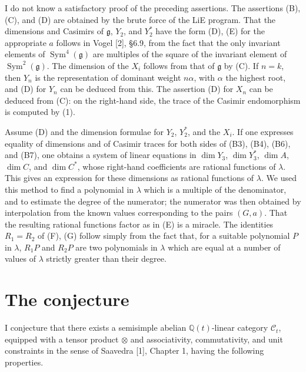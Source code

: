 \documentclass[11pt,a4paper]{article}
\DeclareMathOperator{\Sym}{Sym}
\newcommand{\frg}{\mathfrak{g}}
\newcommand{\Q}{\mathbb{Q}}
\begin{document}
I do not know a satisfactory proof of the preceding assertions. The assertions (B), (C), and (D) are obtained by the brute force of the LiE program. That the dimensions and Casimirs of $\frg$, $Y_2$, and $Y_2^*$ have the form (D), (E) for the appropriate $a$ follows in Vogel [2], \S 6.9, from the fact that the only invariant elements of $\Sym^4(\frg)$ are multiples of the square of the invariant element of $\Sym^2(\frg)$. The dimension of the $X_i$ follows from that of $\frg$ by (C). If $n=k$, then $Y_n$ is the representation of dominant weight $n\alpha$, with $\alpha$ the highest root, and (D) for $Y_n$ can be deduced from this. The assertion (D) for $X_n$ can be deduced from (C): on the right-hand side, the trace of the Casimir endomorphism is computed by (1).

Assume (D) and the dimension formulae for $Y_2$, $Y_2^*$, and the $X_i$. If one expresses equality of dimensions and of Casimir traces for both sides of (B3), (B4), (B6), and (B7), one obtains a system of linear equations in $\dim Y_3$, $\dim Y_3^*$, $\dim A$, $\dim C$, and $\dim C^*$, whose right-hand coefficients are rational functions of $\lambda$. This gives an expression for these dimensions as rational functions of $\lambda$. We used this method to find a polynomial in $\lambda$ which is a multiple of the denominator, and to estimate the degree of the numerator; the numerator was then obtained by interpolation from the known values corresponding to the pairs $(G,a)$. That the resulting rational functions factor as in (E) is a miracle. The identities $R_1=R_2$ of (F), (G) follow simply from the fact that, for a suitable polynomial $P$ in $\lambda$, $R_1P$ and $R_2P$ are two polynomials in $\lambda$ which are equal at a number of values of $\lambda$ strictly greater than their degree.

\section*{The conjecture}

I conjecture that there exists a semisimple abelian $\Q(t)$-linear category $\mathcal C_t$, equipped with a tensor product $\otimes$ and associativity, commutativity, and unit constraints in the sense of Saavedra [1], Chapter 1, having the following properties.
\end{document}
